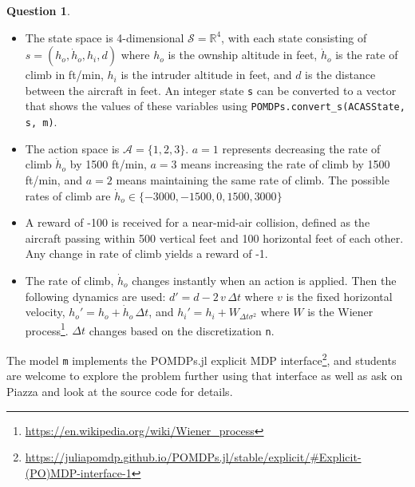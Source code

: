 \documentclass{article}
\theoremstyle{definition}
\newtheorem{question}[thm]{Question}
\newcommand{\reals}{\mathbb{R}}
\begin{document}
\begin{question}
\begin{itemize}
    \item The state space is 4-dimensional $\mathcal{S} = \reals^4$, with each state consisting of $s=(h_o, \dot{h}_o, h_i, d)$ where $h_o$ is the ownship altitude in feet, $\dot{h}_o$ is the rate of climb in ft/min, $h_i$ is the intruder altitude in feet, and $d$ is the distance between the aircraft in feet. An integer state \texttt{s} can be converted to a vector that shows the values of these variables using \texttt{POMDPs.convert\_s(ACASState, s, m)}.
    \item The action space is $\mathcal{A}=\{1,2,3\}$. $a=1$ represents decreasing the rate of climb $\dot{h}_o$ by 1500 ft/min, $a=3$ means increasing the rate of climb by 1500 ft/min, and $a=2$ means maintaining the same rate of climb. The possible rates of climb are $\dot{h}_o \in \{-3000, -1500, 0, 1500, 3000\}$
    \item A reward of -100 is received for a near-mid-air collision, defined as the aircraft passing within 500 vertical feet and 100 horizontal feet of each other. Any change in rate of climb yields a reward of -1.
    \item The rate of climb, $\dot{h}_o$ changes instantly when an action is applied. Then the following dynamics are used: $d' = d - 2\,v\,\Delta t$ where $v$ is the fixed horizontal velocity, $h_o' = h_o + \dot{h}_o\,\Delta t$, and $h_i' = h_i + W_{\Delta t \sigma^2}$ where $W$ is the Wiener process\footnote{\url{https://en.wikipedia.org/wiki/Wiener_process}}. $\Delta t$ changes based on the discretization \texttt{n}.
\end{itemize}

The model \texttt{m} implements the POMDPs.jl explicit MDP interface\footnote{\url{https://juliapomdp.github.io/POMDPs.jl/stable/explicit/\#Explicit-(PO)MDP-interface-1}}, and students are welcome to explore the problem further using that interface as well as ask on Piazza and look at the source code for details.

\end{question}
\end{document}
